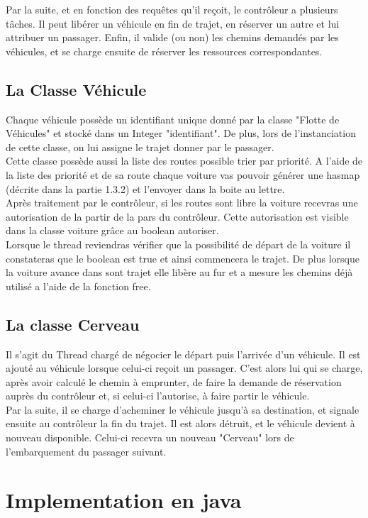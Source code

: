 \documentclass[a4paper, titlepage]{report}
\begin{document}
Par la suite, et en fonction des requêtes qu'il reçoit, le contrôleur a plusieurs tâches. Il peut libérer un véhicule en fin de trajet, en réserver un autre et lui attribuer un passager. Enfin, il valide (ou non) les chemins demandés par les véhicules, et se charge ensuite de réserver les ressources correspondantes.


\section{La Classe Véhicule}

Chaque véhicule possède un identifiant unique donné par la classe "Flotte de Véhicules" et stocké  dans un Integer "identifiant". De plus, lors de l'instanciation de cette classe, on lui assigne le trajet donner par le passager.
\\ Cette classe possède aussi la liste des routes possible trier par priorité. A l'aide de la liste des priorité et de sa route chaque voiture vas pouvoir générer une hasmap (décrite dans la partie 1.3.2) et l'envoyer dans la boite au lettre.
\\
 Après traitement par le contrôleur, si les routes sont libre la voiture recevras une autorisation de la partir de la pars du contrôleur. Cette autorisation est visible dans la classe voiture grâce au boolean autoriser.
\\
Lorsque le thread reviendras vérifier que la possibilité de départ de la voiture il constateras que le boolean est true et ainsi commencera le trajet.
De plus lorsque la voiture avance dans sont trajet elle libère au fur et a mesure les chemins déjà utilisé  a l'aide de la fonction free.

\section{La classe Cerveau}
Il s'agit du Thread chargé de négocier le départ puis l'arrivée d'un véhicule. Il est ajouté au véhicule lorsque celui-ci reçoit un passager. C'est alors lui qui se charge, après avoir calculé le chemin à emprunter, de faire la demande de réservation auprès du contrôleur et, si celui-ci l'autorise, à faire partir le véhicule.\\
Par la suite, il se charge d'acheminer le véhicule jusqu'à sa destination, et signale ensuite au contrôleur la fin du trajet. Il est alors détruit, et le véhicule devient à nouveau disponible. Celui-ci recevra un nouveau "Cerveau" lors de l'embarquement du passager suivant.
\chapter{Implementation en java}
\end{document}
